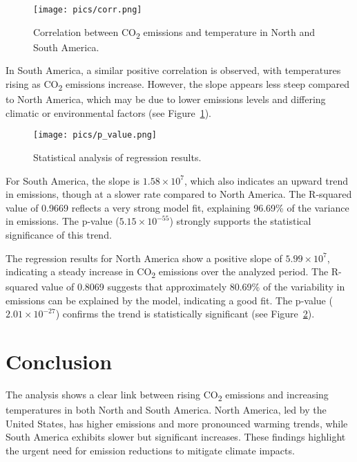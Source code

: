 \documentclass[a4paper,12pt]{article}
\begin{document}
\begin{figure}[htbp]
    \centering
    \texttt{[image: pics/corr.png]} 
    \caption{Correlation between CO\textsubscript{2} emissions and temperature in North and South America.}
    \label{fig:corr}
\end{figure}

\noindent
In South America, a similar positive correlation is observed, with temperatures rising as CO\textsubscript{2} emissions increase. However, the slope appears less steep compared to North America, which may be due to lower emissions levels and differing climatic or environmental factors (see Figure~\ref{fig:corr}).

\begin{figure}[htbp]
    \centering
    \texttt{[image: pics/p\_value.png]} 
    \caption{Statistical analysis of regression results.}
    \label{fig:regression-results}
\end{figure}

\noindent
For South America, the slope is \(1.58 \times 10^7\), which also indicates an upward trend in emissions, though at a slower rate compared to North America. The R-squared value of 0.9669 reflects a very strong model fit, explaining 96.69\% of the variance in emissions. The p-value (\(5.15 \times 10^{-55}\)) strongly supports the statistical significance of this trend.

\noindent
The regression results for North America show a positive slope of \(5.99 \times 10^7\), indicating a steady increase in CO\textsubscript{2} emissions over the analyzed period. The R-squared value of 0.8069 suggests that approximately 80.69\% of the variability in emissions can be explained by the model, indicating a good fit. The p-value (\(2.01 \times 10^{-27}\)) confirms the trend is statistically significant (see Figure~\ref{fig:regression-results}).


\section{Conclusion}

The analysis shows a clear link between rising CO\textsubscript{2} emissions and increasing temperatures in both North and South America. North America, led by the United States, has higher emissions and more pronounced warming trends, while South America exhibits slower but significant increases. These findings highlight the urgent need for emission reductions to mitigate climate impacts.
\end{document}
